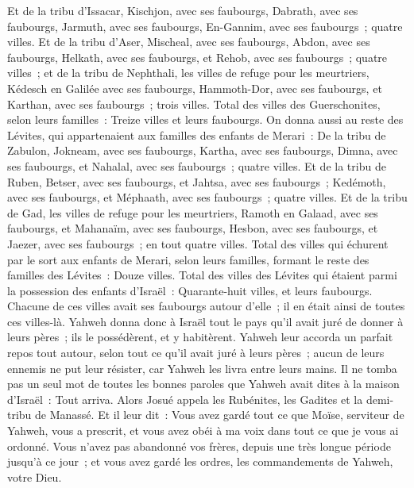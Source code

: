 \begin{multicols}{2}
Et de la tribu d'Issacar, Kischjon, avec ses faubourgs, Dabrath, avec ses faubourgs,
Jarmuth, avec ses faubourgs, En-Gannim, avec ses faubourgs~; quatre villes.
Et de la tribu d'Aser, Mischeal, avec ses faubourgs, Abdon, avec ses faubourgs,
Helkath, avec ses faubourgs, et Rehob, avec ses faubourgs~; quatre villes~;
et de la tribu de Nephthali, les villes de refuge pour les meurtriers, Kédesch en Galilée avec ses faubourgs, Hammoth-Dor, avec ses faubourgs, et Karthan, avec ses faubourgs~; trois villes.
Total des villes des Guerschonites, selon leurs familles~: Treize villes et leurs faubourgs.
On donna aussi au reste des Lévites, qui appartenaient aux familles des enfants de Merari~: De la tribu de Zabulon, Jokneam, avec ses faubourgs, Kartha, avec ses faubourgs,
Dimna, avec ses faubourgs, et Nahalal, avec ses faubourgs~; quatre villes.
Et de la tribu de Ruben, Betser, avec ses faubourgs, et Jahtsa, avec ses faubourgs~;
Kedémoth, avec ses faubourgs, et Méphaath, avec ses faubourgs~; quatre villes.
Et de la tribu de Gad, les villes de refuge pour les meurtriers, Ramoth en Galaad, avec ses faubourgs, et Mahanaïm, avec ses faubourgs,
Hesbon, avec ses faubourgs, et Jaezer, avec ses faubourgs~; en tout quatre villes.
Total des villes qui échurent par le sort aux enfants de Merari, selon leurs familles, formant le reste des familles des Lévites~: Douze villes.
Total des villes des Lévites qui étaient parmi la possession des enfants d'Israël~: Quarante-huit villes, et leurs faubourgs.
Chacune de ces villes avait ses faubourgs autour d'elle~; il en était ainsi de toutes ces villes-là.
Yahweh donna donc à Israël tout le pays qu'il avait juré de donner à leurs pères~; ils le possédèrent, et y habitèrent.
Yahweh leur accorda un parfait repos tout autour, selon tout ce qu'il avait juré à leurs pères~; aucun de leurs ennemis ne put leur résister, car Yahweh les livra entre leurs mains.
Il ne tomba pas un seul mot de toutes les bonnes paroles que Yahweh avait dites à la maison d'Israël~: Tout arriva.
\VerseOne{}Alors Josué appela les Rubénites, les Gadites et la demi-tribu de Manassé.
Et il leur dit~: Vous avez gardé tout ce que Moïse, serviteur de Yahweh, vous a prescrit, et vous avez obéi à ma voix dans tout ce que je vous ai ordonné.
Vous n'avez pas abandonné vos frères, depuis une très longue période jusqu'à ce jour~; et vous avez gardé les ordres, les commandements de Yahweh, votre Dieu.

\end{multicols}
